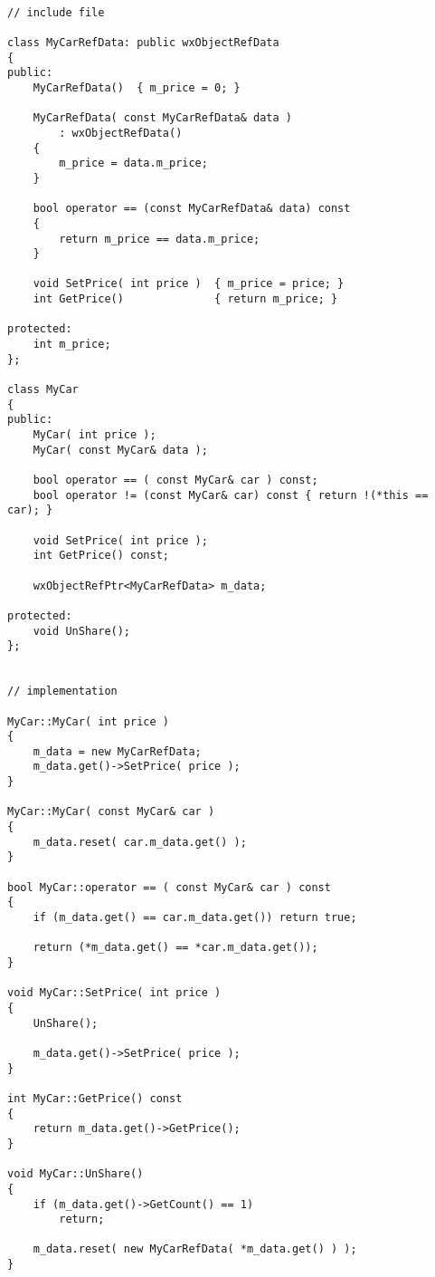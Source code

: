 \begin{verbatim}

// include file

class MyCarRefData: public wxObjectRefData
{
public:
    MyCarRefData()  { m_price = 0; }
    
    MyCarRefData( const MyCarRefData& data )
        : wxObjectRefData()
    {
        m_price = data.m_price;
    }

    bool operator == (const MyCarRefData& data) const
    {
        return m_price == data.m_price;
    }
    
    void SetPrice( int price )  { m_price = price; }
    int GetPrice()              { return m_price; }
    
protected:
    int m_price;
};

class MyCar
{
public:
    MyCar( int price );
    MyCar( const MyCar& data );
    
    bool operator == ( const MyCar& car ) const;
    bool operator != (const MyCar& car) const { return !(*this == car); }

    void SetPrice( int price );
    int GetPrice() const;

    wxObjectRefPtr<MyCarRefData> m_data;
    
protected:
    void UnShare();
};


// implementation

MyCar::MyCar( int price )
{
    m_data = new MyCarRefData;
    m_data.get()->SetPrice( price );
}

MyCar::MyCar( const MyCar& car )
{
    m_data.reset( car.m_data.get() );
}

bool MyCar::operator == ( const MyCar& car ) const
{
    if (m_data.get() == car.m_data.get()) return true;

    return (*m_data.get() == *car.m_data.get());
}

void MyCar::SetPrice( int price )
{
    UnShare();
        
    m_data.get()->SetPrice( price );
}

int MyCar::GetPrice() const
{
    return m_data.get()->GetPrice();
}

void MyCar::UnShare()
{
    if (m_data.get()->GetCount() == 1)
        return;
    
    m_data.reset( new MyCarRefData( *m_data.get() ) );
}

\end{verbatim}



